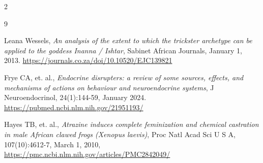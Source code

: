 \documentclass[10pt]{article}
\begin{document}
\begin{multicols}{2}
\begin{thebibliography}{9}
{	 Leana Wessels, \textit{An analysis of the extent to which the trickster archetype can be applied to the goddess Inanna / Ishtar}, Sabinet African Journals, January 1, 2013. \url{https://journals.co.za/doi/10.10520/EJC139821}
	
	 Frye CA, et. al., \textit{Endocrine disrupters: a review of some sources, effects, and mechanisms of actions on behaviour and neuroendocrine systems}, J Neuroendocrinol, 24(1):144-59, January 2024. \url{https://pubmed.ncbi.nlm.nih.gov/21951193/}
	
	 Hayes TB, et. al., \textit{Atrazine induces complete feminization and chemical castration in male African clawed frogs (Xenopus laevis)}, Proc Natl Acad Sci U S A, 107(10):4612-7, March 1, 2010, \url{https://pmc.ncbi.nlm.nih.gov/articles/PMC2842049/}
}
\end{thebibliography}

\end{multicols}


\end{document}
